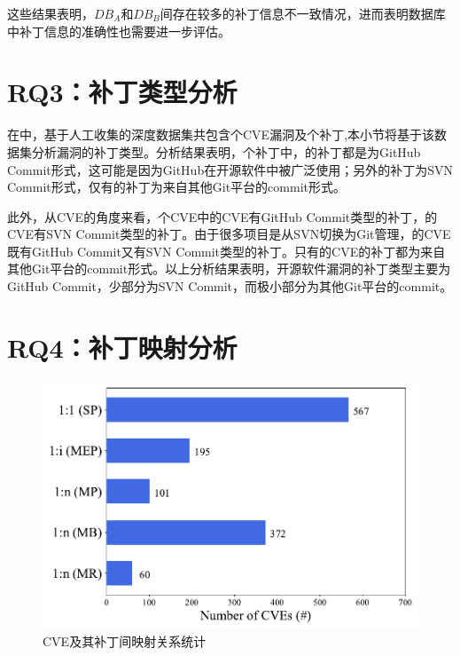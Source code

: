 这些结果表明，$DB_A$和$DB_B$间存在较多的补丁信息不一致情况，进而表明数据库中补丁信息的准确性也需要进一步评估。


\section{RQ3：补丁类型分析}\label{sec:type}

在中，基于人工收集的深度数据集共包含个CVE漏洞及个补丁,本小节将基于该数据集分析漏洞的补丁类型。分析结果表明，个补丁中，的补丁都是为GitHub Commit形式，这可能是因为GitHub在开源软件中被广泛使用；另外的补丁为SVN Commit形式，仅有的补丁为来自其他Git平台的commit形式。

此外，从CVE的角度来看，个CVE中的CVE有GitHub Commit类型的补丁，的CVE有SVN Commit类型的补丁。由于很多项目是从SVN切换为Git管理，的CVE既有GitHub Commit又有SVN Commit类型的补丁。只有的CVE的补丁都为来自其他Git平台的commit形式。以上分析结果表明，开源软件漏洞的补丁类型主要为GitHub Commit，少部分为SVN Commit，而极小部分为其他Git平台的commit。

\section{RQ4：补丁映射分析}\label{sec:cardinality}
\begin{figure}[h]
\centering
\includegraphics[scale=0.80]{res/rq4-cardinality.pdf}
\vspace{-10pt}
\caption{CVE及其补丁间映射关系统计}\label{fig:rq4-cardinality}
\end{figure}

